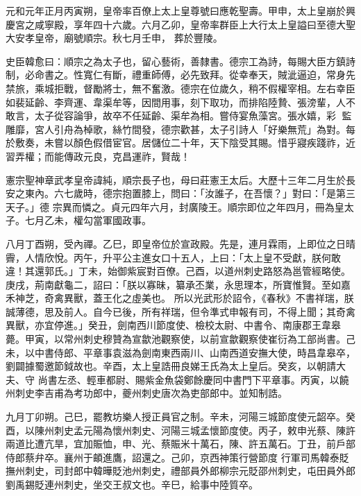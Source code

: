 \begin{pinyinscope}
 元和元年正月丙寅朔，皇帝率百僚上太上皇尊號曰應乾聖壽。甲申，太上皇崩於興慶宮之咸寧殿，享年四十六歲。六月乙卯，皇帝率群臣上大行太上皇謚曰至德大聖大安孝皇帝，廟號順宗。秋七月壬申，
 葬於豐陵。



 史臣韓愈曰：順宗之為太子也，留心藝術，善隸書。德宗工為詩，每賜大臣方鎮詩制，必命書之。性寬仁有斷，禮重師傅，必先致拜。從幸奉天，賊泚逼迫，常身先禁旅，乘城拒戰，督勵將士，無不奮激。德宗在位歲久，稍不假權宰相。左右幸臣如裴延齡、李齊運、韋渠牟等，因間用事，刻下取功，而排陷陸贄、張滂輩，人不敢言，太子從容論爭，故卒不任延齡、渠牟為相。嘗侍宴魚藻宮。張水嬉，彩
 監雕靡，宮人引舟為棹歌，絲竹間發，德宗歡甚，太子引詩人「好樂無荒」為對。每於敷奏，未嘗以顏色假借宦官。居儲位二十年，天下陰受其賜。惜乎寢疾踐祚，近習弄權；而能傳政元良，克昌運祚，賢哉！



 憲宗聖神章武孝皇帝諱純，順宗長子也，母曰莊憲王太后。大歷十三年二月生於長安之東內。六七歲時，德宗抱置膝上，問曰：「汝誰子，在吾懷？」對曰：「是第三天子。」德
 宗異而憐之。貞元四年六月，封廣陵王。順宗即位之年四月，冊為皇太子。七月乙未，權勾當軍國政事。



 八月丁酉朔，受內禪。乙巳，即皇帝位於宣政殿。先是，連月霖雨，上即位之日晴霽，人情欣悅。丙午，升平公主進女口十五人，上曰：「太上皇不受獻，朕何敢違！其還郭氏。」丁未，始御紫宸對百僚。己酉，以道州刺史路怒為邕管經略使。庚戌，荊南獻龜二，詔曰：「朕以寡昧，纂承丕業，永思理本，所寶惟賢。至如嘉禾神芝，奇禽異獸，蓋王化之虛美也。
 所以光武形於詔令，《春秋》不書祥瑞，朕誠薄德，思及前人。自今已後，所有祥瑞，但令準式申報有司，不得上聞；其奇禽異獸，亦宜停進。」癸丑，劍南西川節度使、檢校太尉、中書令、南康郡王韋皋薨。甲寅，以常州刺史穆贊為宣歙池觀察使，以前宣歙觀察使崔衍為工部尚書。己未，以中書侍郎、平章事袁滋為劍南東西兩川、山南西道安撫大使，時昌韋皋卒，劉闢據蜀邀節鉞故也。辛酉，太上皇誥冊良娣王氏為太上皇后。癸亥，以朝請大夫、守
 尚書左丞、輕車都尉、賜紫金魚袋鄭餘慶同中書門下平章事。丙寅，以饒州刺史李吉甫為考功郎中，夔州刺史唐次為吏部郎中。並知制誥。



 九月丁卯朔。己巳，罷教坊樂人授正員官之制。辛未，河陽三城節度使元韶卒。癸酉，以陳州刺史孟元陽為懷州刺史、河陽三城孟懷節度使。丙子，敕申光蔡、陳許兩道比遭亢旱，宜加賑恤，申、光、蔡賑米十萬石，陳、許五萬石。丁丑，前戶部侍郎蔡弁卒。襄州于頔進鷹，詔還之。己卯，京西神策行營節度
 行軍司馬韓泰貶撫州刺史，司封郎中韓曄貶池州刺史，禮部員外郎柳宗元貶邵州刺史，屯田員外郎劉禹錫貶連州刺史，坐交王叔文也。辛巳，給事中陸質卒。




\end{pinyinscope}
